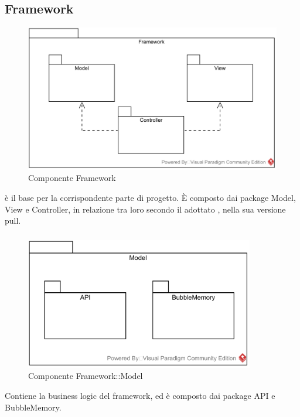 \subsection{Framework} \label{framework}
\begin{figure}[H]
	\centering
	\includegraphics[width=15cm]{./diagrammi/framework.png}
	\caption{Componente Framework}
\end{figure}
 è il  base per la corrispondente parte di progetto. È composto dai package Model, View e Controller, in relazione tra loro secondo il  adottato , nella sua versione pull.

\subsubsection{\class} \label{\class}
\begin{figure}[H]
	\centering
	\includegraphics[width=10cm]{./diagrammi/framework/model.png}
	\caption{Componente Framework::Model}
\end{figure}
Contiene la business logic del framework, ed è composto dai package API e BubbleMemory.

